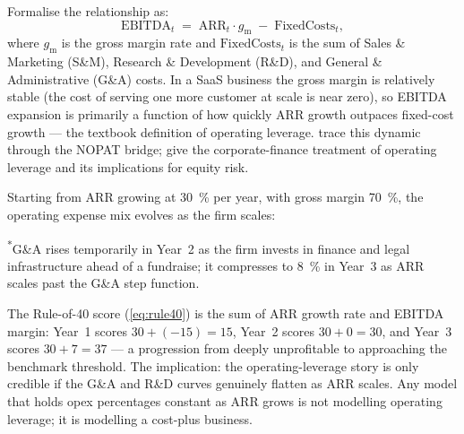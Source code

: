 Formalise the relationship as:
\begin{equation}\label{eq:op-model}
  \mathrm{EBITDA}_{t}
  \;=\;
  \mathrm{ARR}_{t}\cdot g_{\mathrm{m}}
  \;-\;
  \mathrm{FixedCosts}_{t},
\end{equation}
where $g_{\mathrm{m}}$ is the gross margin rate and $\mathrm{FixedCosts}_{t}$ is the sum of
Sales \& Marketing (S\&M), Research \& Development (R\&D), and General \& Administrative (G\&A)
costs. In a SaaS business the gross margin is relatively stable (the cost of serving one more
customer at scale is near zero), so EBITDA expansion is primarily a function of how quickly
ARR growth outpaces fixed-cost growth --- the textbook definition of operating leverage.
\textcite{koller2025valuation} trace this dynamic through the NOPAT bridge; \textcite{ross2022}
give the corporate-finance treatment of operating leverage and its implications for equity risk.

\begin{example}
Starting from  ARR growing at \qty{30}{\percent} per year, with gross margin
\qty{70}{\percent}, the operating expense mix evolves as the firm scales:

\medskip
\noindent{}

\medskip
\noindent\textsuperscript{*}G\&A rises temporarily in Year~2 as the firm invests in finance
and legal infrastructure ahead of a fundraise; it compresses to \qty{8}{\percent} in Year~3
as ARR scales past the G\&A step function.

\medskip
The Rule-of-40 score (\cref{eq:rule40}) is the sum of ARR growth rate and EBITDA margin: Year~1
scores \(30+(-15)=15\), Year~2 scores \(30+0=30\), and Year~3 scores \(30+7=37\) --- a
progression from deeply unprofitable to approaching the benchmark threshold. The implication:
the operating-leverage story is only credible if the G\&A and R\&D curves genuinely flatten as
ARR scales. Any model that holds opex percentages constant as ARR grows is not modelling
operating leverage; it is modelling a cost-plus business.
\end{example}


